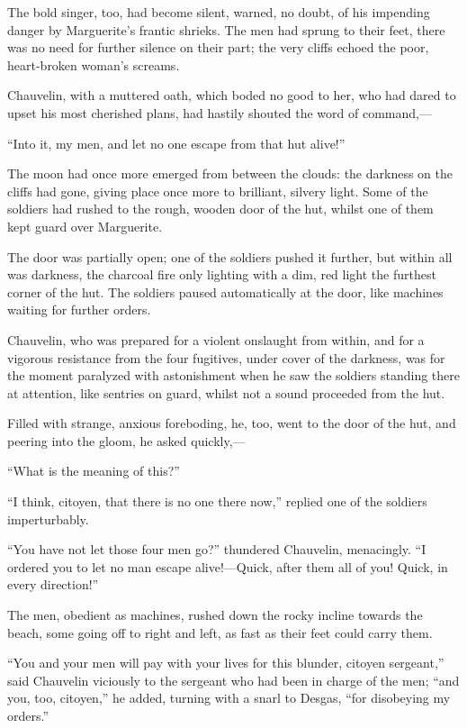 The bold singer, too, had become silent, warned, no doubt, of his impending danger by Marguerite's frantic shrieks. The men had sprung to their feet, there was no need for further silence on their part; the very cliffs echoed the poor, heart-broken woman's screams.

Chauvelin, with a muttered oath, which boded no good to her, who had dared to upset his most cherished plans, had hastily shouted the word of command,---

\enquote{Into it, my men, and let no one escape from that hut alive!}

The moon had once more emerged from between the clouds: the darkness on the cliffs had gone, giving place once more to brilliant, silvery light. Some of the soldiers had rushed to the rough, wooden door of the hut, whilst one of them kept guard over Marguerite.

The door was partially open; one of the soldiers pushed it further, but within all was darkness, the charcoal fire only lighting with a dim, red light the furthest corner of the hut. The soldiers paused automatically at the door, like machines waiting for further orders.

Chauvelin, who was prepared for a violent onslaught from within, and for a vigorous resistance from the four fugitives, under cover of the darkness, was for the moment paralyzed with astonishment when he saw the soldiers standing there at attention, like sentries on guard, whilst not a sound proceeded from the hut.

Filled with strange, anxious foreboding, he, too, went to the door of the hut, and peering into the gloom, he asked quickly,---

\enquote{What is the meaning of this?}

\enquote{I think, citoyen, that there is no one there now,} replied one of the soldiers imperturbably.

\enquote{You have not let those four men go?} thundered Chauvelin, menacingly. \enquote{I ordered you to let no man escape alive!---Quick, after them all of you! Quick, in every direction!}

The men, obedient as machines, rushed down the rocky incline towards the beach, some going off to right and left, as fast as their feet could carry them.

\enquote{You and your men will pay with your lives for this blunder, citoyen sergeant,} said Chauvelin viciously to the sergeant who had been in charge of the men; \enquote{and you, too, citoyen,} he added, turning with a snarl to Desgas, \enquote{for disobeying my orders.}

